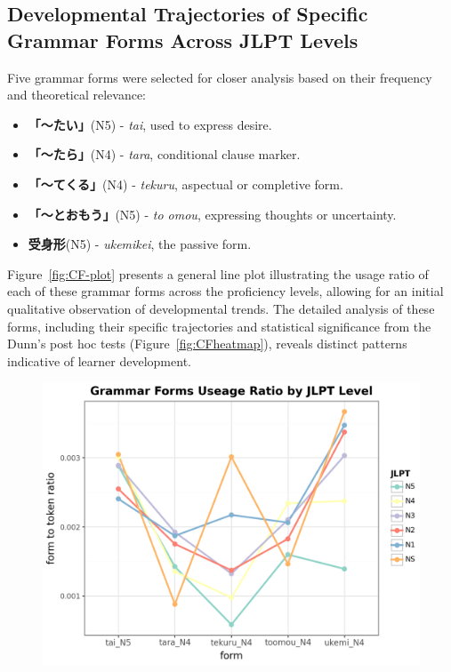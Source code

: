 \subsection{Developmental Trajectories of Specific Grammar Forms Across JLPT Levels}

Five grammar forms were selected for closer analysis based on their frequency and theoretical relevance:

\begin{itemize}
\item \textbf{「〜たい」}(N5) - \textit{tai}, used to express desire.
\item \textbf{「〜たら」}(N4) - \textit{tara}, conditional clause marker.
\item \textbf{「〜てくる」}(N4) - \textit{tekuru}, aspectual or completive form.
\item \textbf{「〜とおもう」}(N5) - \textit{to omou}, expressing thoughts or uncertainty.
\item \textbf{受身形}(N5) - \textit{ukemikei}, the passive form.
\end{itemize}

Figure~\ref{fig:CF-plot} presents a general line plot illustrating the usage ratio of each of these grammar forms
across the proficiency levels, allowing for an initial qualitative observation of developmental trends. The detailed
analysis of these forms, including their specific trajectories and statistical significance from the Dunn's post hoc
tests (Figure~\ref{fig:CFheatmap}), reveals distinct patterns indicative of learner development.


\begin{figure}[h]
\centering
\includegraphics[scale=.5]{img/CF-plot}
\caption[The use of the top 5 frequently used grammar forms across JLPT levels]{}
\label{fig:CFplot}
\end{figure}


